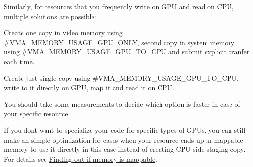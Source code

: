 Similarly, for resources that you frequently write on G\+PU and read on C\+PU, multiple solutions are possible\+:


\begin{DoxyEnumerate}
\item Create one copy in video memory using \#\+V\+M\+A\+\_\+\+M\+E\+M\+O\+R\+Y\+\_\+\+U\+S\+A\+G\+E\+\_\+\+G\+P\+U\+\_\+\+O\+N\+LY, second copy in system memory using \#\+V\+M\+A\+\_\+\+M\+E\+M\+O\+R\+Y\+\_\+\+U\+S\+A\+G\+E\+\_\+\+G\+P\+U\+\_\+\+T\+O\+\_\+\+C\+PU and submit explicit tranfer each time.
\item Create just single copy using \#\+V\+M\+A\+\_\+\+M\+E\+M\+O\+R\+Y\+\_\+\+U\+S\+A\+G\+E\+\_\+\+G\+P\+U\+\_\+\+T\+O\+\_\+\+C\+PU, write to it directly on G\+PU, map it and read it on C\+PU.
\end{DoxyEnumerate}

You should take some measurements to decide which option is faster in case of your specific resource.

If you don\textquotesingle{}t want to specialize your code for specific types of G\+P\+Us, you can still make an simple optimization for cases when your resource ends up in mappable memory to use it directly in this case instead of creating C\+P\+U-\/side staging copy. For details see \hyperlink{memory_mapping_memory_mapping_finding_if_memory_mappable}{Finding out if memory is mappable}. 